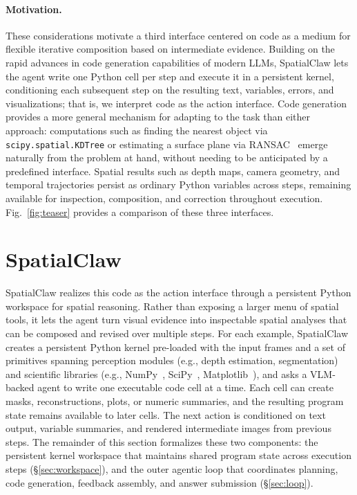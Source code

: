 \documentclass{llmxive}
\providecommand{\ours}{SpatialClaw}
\begin{document}
\paragraph{Motivation.} These considerations motivate a third interface centered on code as a medium for flexible iterative composition based on intermediate evidence.
Building on the rapid advances in code generation capabilities of modern LLMs, \ours{} lets the agent write one Python cell per step and execute it in a persistent kernel, conditioning each subsequent step on the resulting text, variables, errors, and visualizations; that is, we interpret code as the action interface.
Code generation provides a more general mechanism for adapting to the task than either approach: computations such as finding the nearest object via \texttt{scipy.spatial.KDTree} or estimating a surface plane via RANSAC~\citep{fischler1981random} emerge naturally from the problem at hand, without needing to be anticipated by a predefined interface.
Spatial results such as depth maps, camera geometry, and temporal trajectories persist as ordinary Python variables across steps, remaining available for inspection, composition, and correction throughout execution.
Fig.~\ref{fig:teaser} provides a comparison of these three interfaces.

\section{SpatialClaw}
\label{sec:method}

\ours{} realizes this code as the action interface through a persistent Python workspace for spatial reasoning.
Rather than exposing a larger menu of spatial tools, it lets the agent turn visual evidence into inspectable spatial analyses that can be composed and revised over multiple steps.
For each example, \ours{} creates a persistent Python kernel pre-loaded with the input frames and a set of primitives spanning perception modules (e.g., depth estimation, segmentation) and scientific libraries (e.g., NumPy~\citep{harris2020array}, SciPy~\citep{2020SciPy-NMeth}, Matplotlib~\citep{Hunter:2007}), and asks a VLM-backed agent to write one executable code cell at a time.
Each cell can create masks, reconstructions, plots, or numeric summaries, and the resulting program state remains available to later cells.
The next action is conditioned on text output, variable summaries, and rendered intermediate images from previous steps.
The remainder of this section formalizes these two components: the persistent kernel workspace that maintains shared program state across execution steps (\S\ref{sec:workspace}), and the outer agentic loop that coordinates planning, code generation, feedback assembly, and answer submission (\S\ref{sec:loop}).
\end{document}
